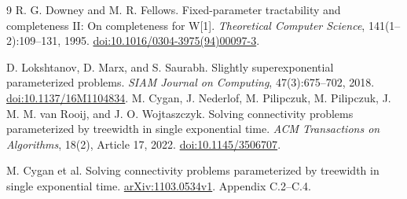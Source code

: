 \documentclass[11pt]{article}
\begin{document}
\begin{thebibliography}{9}
R. G. Downey and M. R. Fellows.
Fixed-parameter tractability and completeness II: On completeness for W[1].
\emph{Theoretical Computer Science}, 141(1--2):109--131, 1995.
\href{https://doi.org/10.1016/0304-3975(94)00097-3}{doi:10.1016/0304-3975(94)00097-3}.

D. Lokshtanov, D. Marx, and S. Saurabh.
Slightly superexponential parameterized problems.
\emph{SIAM Journal on Computing}, 47(3):675--702, 2018.
\href{https://doi.org/10.1137/16M1104834}{doi:10.1137/16M1104834}.
M. Cygan, J. Nederlof, M. Pilipczuk, M. Pilipczuk, J. M. M. van Rooij,
and J. O. Wojtaszczyk.
Solving connectivity problems parameterized by treewidth in single
exponential time.
\emph{ACM Transactions on Algorithms}, 18(2), Article 17, 2022.
\href{https://doi.org/10.1145/3506707}{doi:10.1145/3506707}.

M. Cygan et al.
Solving connectivity problems parameterized by treewidth in single
exponential time. \href{https://arxiv.org/abs/1103.0534v1}{arXiv:1103.0534v1}.
Appendix C.2--C.4.
\end{thebibliography}
\end{document}
